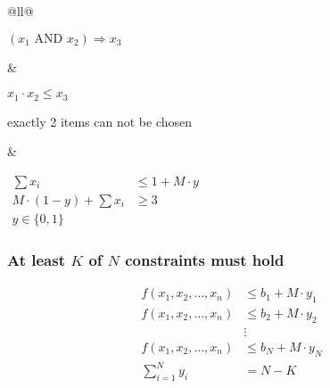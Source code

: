 \documentclass[
  czech,
  a4paperpaper,
]{article}
\begin{document}
\begin{longtable}[]{@{}ll@{}}
\begin{minipage}[t]{0.46\columnwidth}\raggedright
\((x_1 \text{ AND } x_2) \Rightarrow x_3\)\strut
\end{minipage} & \begin{minipage}[t]{0.48\columnwidth}\raggedright
\(x_1 \cdot x_2 \leq x_3\)\strut
\end{minipage}\tabularnewline
\begin{minipage}[t]{0.46\columnwidth}\raggedright
exactly 2 items can not be chosen\strut
\end{minipage} & \begin{minipage}[t]{0.48\columnwidth}\raggedright
\(\!\begin{aligned}  \sum x_i & \leq 1 + M \cdot y \\  M \cdot (1 - y) + \sum x_i & \geq 3 \\  y \in \{ 0, 1 \}  \end{aligned}\)\strut
\end{minipage}\tabularnewline
\bottomrule
\end{longtable}

\hypertarget{at-least-k-of-n-constraints-must-hold}{%
\subsubsection{\texorpdfstring{At least \(K\) of \(N\) constraints must
hold}{At least K of N constraints must hold}}\label{at-least-k-of-n-constraints-must-hold}}

\begin{align*}
f(x_1, x_2, \dots, x_n) &\leq b_1 + M \cdot y_1 \\
f(x_1, x_2, \dots, x_n) &\leq b_2 + M \cdot y_2 \\
& \vdots \\
f(x_1, x_2, \dots, x_n) &\leq b_N + M \cdot y_N \\
\sum_{i = 1}^N y_i &= N - K
\end{align*}
\end{document}
